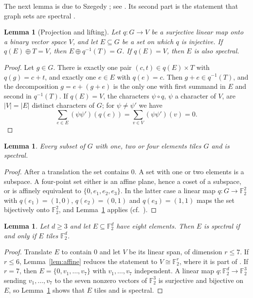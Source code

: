 \documentclass[11pt]{amsart}
\newtheorem{lemma}[theorem]{Lemma}
\theoremstyle{definition}
\theoremstyle{remark}
\numberwithin{equation}{section}
\numberwithin{table}{section}
\newcommand{\F}{\mathbb{F}}
\begin{document}
The next lemma is due to Szegedy \cite{Sze98}; see \cite[Lemma~6]{FMM06}. Its second part is the statement that graph sets are spectral \cite[Proposition~6.2]{AAB17}.

\begin{lemma}[Projection and lifting]\label{lem:lift}
Let $q\colon G\to V$ be a surjective linear map onto a binary vector space $V$, and let $E\subseteq G$ be a set on which $q$ is injective. If $q(E)\oplus T=V$, then $E\oplus q^{-1}(T)=G$. If $q(E)=V$, then $E$ is also spectral.
\end{lemma}

\begin{proof}
Let $g\in G$. There is exactly one pair $(c,t)\in q(E)\times T$ with $q(g)=c+t$, and exactly one $e\in E$ with $q(e)=c$. Then $g+e\in q^{-1}(T)$, and the decomposition $g=e+(g+e)$ is the only one with first summand in $E$ and second in $q^{-1}(T)$. If $q(E)=V$, the characters $\psi\circ q$, $\psi$ a character of $V$, are $|V|=|E|$ distinct characters of $G$; for $\psi\ne\psi'$ we have
\[
\sum_{e\in E}(\psi\psi')(q(e))=\sum_{v\in V}(\psi\psi')(v)=0.
\]
\end{proof}

\begin{lemma}\label{lem:small}
Every subset of $G$ with one, two or four elements tiles $G$ and is spectral.
\end{lemma}

\begin{proof}
After a translation the set contains $0$. A set with one or two elements is a subspace. A four-point set either is an affine plane, hence a coset of a subspace, or is affinely equivalent to $\{0,e_1,e_2,e_3\}$. In the latter case a linear map $q\colon G\to\F_2^2$ with $q(e_1)=(1,0)$, $q(e_2)=(0,1)$ and $q(e_3)=(1,1)$ maps the set bijectively onto $\F_2^2$, and Lemma~\ref{lem:lift} applies (cf.\ \cite[Proposition~5.1]{FS20}).
\end{proof}

\begin{lemma}\label{lem:eight}
Let $d\ge3$ and let $E\subseteq\F_2^d$ have eight elements. Then $E$ is spectral if and only if $E$ tiles $\F_2^d$.
\end{lemma}

\begin{proof}
Translate $E$ to contain $0$ and let $V$ be its linear span, of dimension $r\le7$. If $r\le6$, Lemma~\ref{lem:affine} reduces the statement to $V\cong\F_2^r$, where it is part of \cite[Theorem~1.2]{FS20}. If $r=7$, then $E=\{0,v_1,\dots,v_7\}$ with $v_1,\dots,v_7$ independent. A linear map $q\colon\F_2^d\to\F_2^3$ sending $v_1,\dots,v_7$ to the seven nonzero vectors of $\F_2^3$ is surjective and bijective on $E$, so Lemma~\ref{lem:lift} shows that $E$ tiles and is spectral.
\end{proof}
\end{document}
